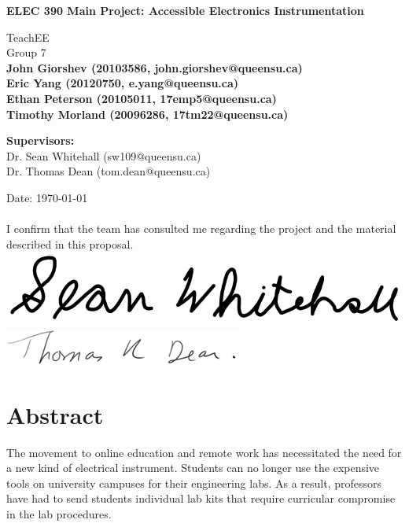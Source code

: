\documentclass[letterpaper,12pt]{article}
\begin{document}
\begin{titlepage}
    \begin{center}
        \vspace*{1cm}

        \Large
        \textbf{ELEC 390 Main Project: Accessible Electronics Instrumentation}

        \vspace{0.5cm}
        TeachEE\\
        Group 7 \\
        \vspace{1.5cm}
        \normalsize
        \textbf{John Giorshev (20103586, john.giorshev@queensu.ca) \\ Eric Yang (20120750, e.yang@queensu.ca) \\ Ethan Peterson (20105011, 17emp5@queensu.ca) \\ Timothy Morland (20096286, 17tm22@queensu.ca)}

        \vfill
            
        \textbf{Supervisors:}\\
        Dr. Sean Whitehall (sw109@queensu.ca) \\
        Dr. Thomas Dean (tom.dean@queensu.ca) \\
            
        \vspace{0.8cm}

        Date: \today \\~\\
        I confirm that the team has consulted me regarding the project and the
        material described in this proposal.\\
        \includegraphics{figures/SWsignature} \\
        \includegraphics{figures/TDsignature} \\
    \end{center}
\end{titlepage}
\section*{Abstract}
The movement to online education and remote work has necessitated the need for a
new kind of electrical instrument. Students can no longer use the expensive
tools on university campuses for their engineering labs. As a result, professors
have had to send students individual lab kits that require curricular compromise
in the lab procedures.\\
\end{document}
